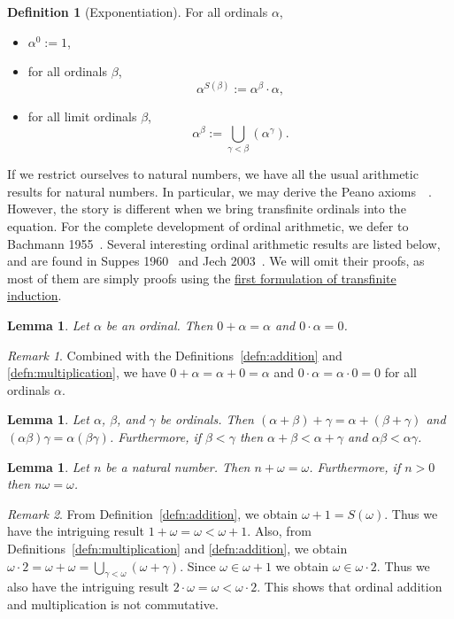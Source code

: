 \documentclass[a4paper,11pt]{article}
\theoremstyle{plain}
\newtheorem{lem}[thm]{Lemma}
\theoremstyle{definition}
\newtheorem{defn}[thm]{Definition}
\theoremstyle{remark}
\newtheorem*{rem}{Remark}
\begin{document}
\begin{defn}[Exponentiation]
For all ordinals $\alpha$,
\begin{itemize}
\item $\alpha^0 := 1$,
\item for all ordinals $\beta$,
\[\alpha^{S(\beta)} := \alpha^\beta \cdot \alpha,\]
\item for all limit ordinals $\beta$, 
\[\alpha^\beta := \bigcup_{\gamma<\beta} (\alpha^\gamma).\]
\end{itemize}
\end{defn}

If we restrict ourselves to natural numbers, we have all the usual arithmetic results for natural numbers. In particular, we may derive the Peano axioms~\citep[pp. 135--150]{SuppesBook}~\cite[pp. 27--70]{Peano}. However, the story is different when we bring transfinite ordinals into the equation. For the complete development of ordinal arithmetic, we defer to Bachmann 1955~\citep{BachmannTransfinite}. Several interesting ordinal arithmetic results are listed below, and are found in Suppes 1960~\citep[pp. 205--224]{SuppesBook} and Jech 2003~\citep[pp. 23--24]{JechBook}. We will omit their proofs, as most of them are simply proofs using the \hyperref[thm:Tinduction1]{first formulation of transfinite induction}.

\begin{lem}
Let $\alpha$ be an ordinal. Then $0 + \alpha = \alpha$ and $0 \cdot \alpha = 0$.
\end{lem}
\begin{rem}
Combined with the Definitions~\ref{defn:addition} and \ref{defn:multiplication}, we have $0 + \alpha = \alpha + 0 = \alpha$ and $0 \cdot \alpha = \alpha \cdot 0 = 0$ for all ordinals $\alpha$.
\end{rem}

\begin{lem}
Let $\alpha$, $\beta$, and $\gamma$ be ordinals. Then $(\alpha + \beta) + \gamma = \alpha + (\beta + \gamma)$ and $(\alpha\beta)\gamma = \alpha(\beta\gamma)$. Furthermore, if $\beta < \gamma$ then $\alpha + \beta < \alpha + \gamma$ and $\alpha\beta < \alpha\gamma$.
\end{lem}

\begin{lem}
\label{lem:OrdinalNotCommutative}
Let $n$ be a natural number. Then $n + \omega = \omega$. Furthermore, if $n > 0$ then $n\omega = \omega$.
\end{lem}
\begin{rem}
From Definition~\ref{defn:addition}, we obtain $\omega + 1 = S(\omega)$. Thus we have the intriguing result $1 + \omega = \omega < \omega + 1$. Also, from Definitions~\ref{defn:multiplication} and \ref{defn:addition}, we obtain $\omega\cdot 2 = \omega + \omega = \bigcup_{\gamma<\omega}(\omega + \gamma)$. Since $\omega \in \omega + 1$ we obtain $\omega \in \omega \cdot 2$. Thus we also have the intriguing result $2\cdot\omega = \omega < \omega\cdot 2$. This shows that ordinal addition and multiplication is not commutative.
\end{rem}
\end{document}
